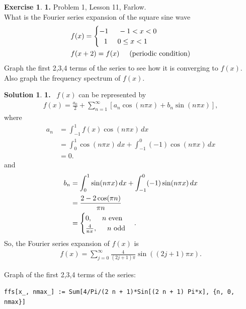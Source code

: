 \documentclass{article}
\theoremstyle{definition}
\newtheorem*{exer*}{Exercise}
\newtheorem*{sln*}{Solution}
\newcommand{\f}[2]{\frac{#1}{#2}}
\newcommand{\lp}{\left(}
\newcommand{\rp}{\right)}
\newcommand{\lb}{\left[}
\newcommand{\rb}{\right]}
\begin{document}
\begin{exer*}\textbf{1.} Problem 1, Lesson 11, Farlow.\\
	
	What is the Fourier series expansion of the square sine wave
	\begin{align*}
	&f(x) = \begin{cases}
	-1 \hspace{0.5cm} -1 < x < 0\\
	\,\,\,\,1 \hspace{0.5cm} 0 \leq x < 1
	\end{cases}\\
	&f(x+2) = f(x) \hspace{0.5cm}\text{(periodic condition)}
	\end{align*} 
	Graph the first 2,3,4 terms of the series to see how it is converging to $f(x)$. Also graph the frequency spectrum of $f(x)$.
	
	\begin{sln*}\textbf{1.}
		$\,$
		$f(x)$ can be represented by
		\begin{align*}
		f(x) = \f{a_0}{2} + \sum^\infty_{n=1}\lb  a_n\cos(n\pi x) + b_n\sin(n\pi x)  \rb,
		\end{align*}
		where
		\begin{align*}
		a_n &= \int^1_{-1}f(x)\cos(n\pi x)\,dx\\
		&= \int^1_0 \cos(n\pi x)\,dx + \int^0_{-1}(-1)\cos(n\pi x)\,dx \\
		&= 0.
		\end{align*}
		and
		\begin{align*}
		b_n &= \int^1_0 \sin(n\pi x)\,dx + \int^0_{-1}(-1)\sin(n\pi x)\,dx\\
		&= \frac{2-2 \cos (\pi  n)}{\pi  n}\\
		&= \begin{cases}
		0, \hspace{0.5cm} n \text{ even}\\
		\f{4}{n\pi }, \hspace{0.5cm} n \text{ odd}
		\end{cases}.
		\end{align*}
		So, the Fourier series expansion of $f(x)$ is
		\begin{align*}
		f(x) = \sum^\infty_{j=0}\f{4}{(2j+1)\pi} \sin\lp (2j+1)\pi x \rp.
		\end{align*}
		
		Graph of the first 2,3,4 terms of the series:
		\begin{lstlisting}
ffs[x_, nmax_] := Sum[4/Pi/(2 n + 1)*Sin[(2 n + 1) Pi*x], {n, 0, nmax}]


\end{lstlisting}
\end{sln*}
\end{exer*}
\end{document}
